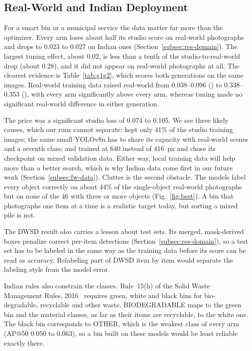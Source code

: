 \subsection{Real-World and Indian Deployment}
\label{subsec:deployment}

For a smart bin or a municipal service the data matter far more than the optimizer. Every arm loses about half its studio score on real-world photographs and drops to 0.023 to 0.027 \mapfifty on Indian ones (Section~\ref{subsec:res-domain}). The largest tuning effect, about 0.02, is less than a tenth of the studio-to-real-world drop (about 0.28), and it did not appear on real-world photographs at all. The clearest evidence is Table~\ref{tab:g1g2}, which scores both generations on the same images. Real-world training data raised real-world \mapfifty from 0.038--0.096 (\genone) to 0.338--0.353 (\gentwo), with every \gentwo arm significantly above every \genone arm, whereas tuning made no significant real-world difference in either generation.

The price was a significant studio loss of 0.074 to 0.105. We see three likely causes, which our runs cannot separate: \gentwo kept only 41\% of the \genone studio training images; the same small YOLOv8n has to share its capacity with real-world scenes and a seventh class; and \gentwo trained at 640 instead of 416~px and chose its checkpoint on mixed validation data. Either way, local training data will help more than a better search, which is why Indian data come first in our future work (Section~\ref{subsec:fw-data}). Clutter is the second obstacle. The models label every object correctly on about 44\% of the single-object real-world photographs but on none of the 46 with three or more objects (Fig.~\ref{fig:best}). A bin that photographs one item at a time is a realistic target today, but sorting a mixed pile is not.

The DWSD result also carries a lesson about test sets. Its merged, mask-derived boxes penalize correct per-item detections (Section~\ref{subsec:res-domain}), so a test set has to be labeled in the same way as the training data before its score can be read as accuracy. Relabeling part of DWSD item by item would separate the labeling style from the model error.

Indian rules also constrain the classes. Rule~15(h) of the Solid Waste Management Rules, 2016~\cite{moefcc2016solid} requires green, white and black bins for bio-degradable, recyclable and other waste. BIODEGRADABLE maps to the green bin and the material classes, as far as their items are recyclable, to the white one. The black bin corresponds to OTHER, which is the weakest class of every arm (AP@50 0.050 to 0.063), so a bin built on these models would be least reliable exactly there.

